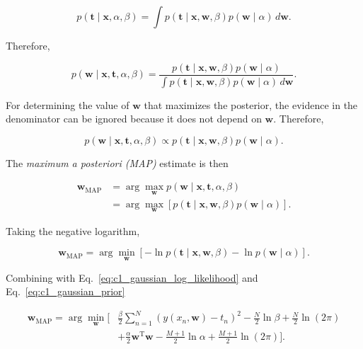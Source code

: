 \documentclass[10pt,twocolumn]{memoir}
\begin{document}
\begin{equation}
    p(\mathbf{t}\mid\mathbf{x},\alpha,\beta) = \int p(\mathbf{t}\mid\mathbf{x},\mathbf{w},\beta)p(\mathbf{w}\mid\alpha)\,d\mathbf{w}.
\end{equation}

Therefore,

\begin{equation}
    p(\mathbf{w}\mid\mathbf{x},\mathbf{t},\alpha,\beta) = \frac{p(\mathbf{t}\mid\mathbf{x},\mathbf{w},\beta)p(\mathbf{w}\mid\alpha)}{\int p(\mathbf{t}\mid\mathbf{x},\mathbf{w},\beta)p(\mathbf{w}\mid\alpha)\,d\mathbf{w}}.
\end{equation}

For determining the value of $\mathbf{w}$ that maximizes the posterior, the evidence in the denominator can be ignored because it does not depend on $\mathbf{w}$. Therefore,

\begin{equation}
    p(\mathbf{w}\mid\mathbf{x},\mathbf{t},\alpha,\beta)\propto p(\mathbf{t}\mid\mathbf{x},\mathbf{w},\beta)p(\mathbf{w}\mid\alpha).
\label{eq:c1_posterior_proportional}
\end{equation}

The \textit{maximum a posteriori (MAP)} estimate is then

\begin{equation}
\begin{aligned}
    \mathbf{w}_{\mathrm{MAP}}
    &= \arg\max_{\mathbf{w}}p(\mathbf{w}\mid\mathbf{x},\mathbf{t},\alpha,\beta) \\
    &= \arg\max_{\mathbf{w}}\left[p(\mathbf{t}\mid\mathbf{x},\mathbf{w},\beta)p(\mathbf{w}\mid\alpha)\right].
\end{aligned}
\end{equation}

Taking the negative logarithm,

\begin{equation}
    \mathbf{w}_{\mathrm{MAP}} = \arg\min_{\mathbf{w}}\left[-\ln p(\mathbf{t}\mid\mathbf{x},\mathbf{w},\beta) -\ln p(\mathbf{w}\mid\alpha)\right].
\end{equation}

Combining with Eq.~\ref{eq:c1_gaussian_log_likelihood} and Eq.~\ref{eq:c1_gaussian_prior}

\begin{equation}
\begin{aligned}
\mathbf{w}_{\mathrm{MAP}}
= \arg\min_{\mathbf{w}}
\Bigg[
&\frac{\beta}{2}\sum_{n=1}^{N}\left(y(x_n,\mathbf{w})-t_n\right)^2 - \frac{N}{2}\ln\beta + \frac{N}{2}\ln(2\pi) \\
&+ \frac{\alpha}{2}\mathbf{w}^{\mathrm{T}}\mathbf{w} - \frac{M+1}{2}\ln\alpha + \frac{M+1}{2}\ln(2\pi)
\Bigg].
\end{aligned}
\end{equation}
\end{document}
